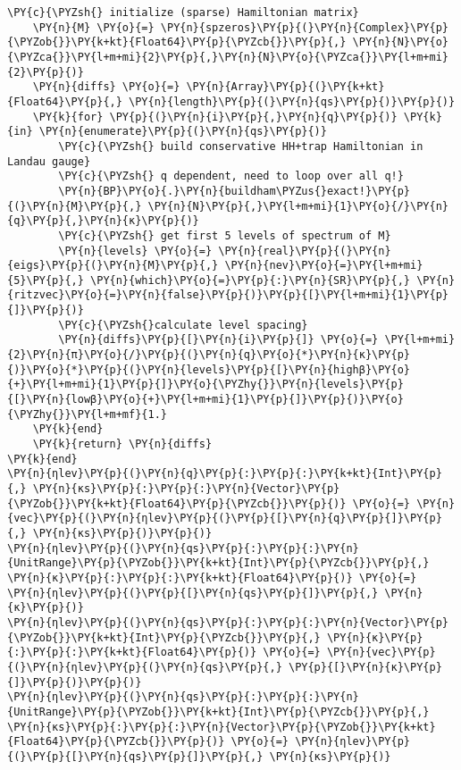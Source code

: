 \begin{Verbatim}[commandchars=\\\{\}]
    \PY{c}{\PYZsh{} initialize (sparse) Hamiltonian matrix}
    \PY{n}{M} \PY{o}{=} \PY{n}{spzeros}\PY{p}{(}\PY{n}{Complex}\PY{p}{\PYZob{}}\PY{k+kt}{Float64}\PY{p}{\PYZcb{}}\PY{p}{,} \PY{n}{N}\PY{o}{\PYZca{}}\PY{l+m+mi}{2}\PY{p}{,}\PY{n}{N}\PY{o}{\PYZca{}}\PY{l+m+mi}{2}\PY{p}{)}
    \PY{n}{diffs} \PY{o}{=} \PY{n}{Array}\PY{p}{(}\PY{k+kt}{Float64}\PY{p}{,} \PY{n}{length}\PY{p}{(}\PY{n}{qs}\PY{p}{)}\PY{p}{)}
    \PY{k}{for} \PY{p}{(}\PY{n}{i}\PY{p}{,}\PY{n}{q}\PY{p}{)} \PY{k}{in} \PY{n}{enumerate}\PY{p}{(}\PY{n}{qs}\PY{p}{)}
        \PY{c}{\PYZsh{} build conservative HH+trap Hamiltonian in Landau gauge}
        \PY{c}{\PYZsh{} q dependent, need to loop over all q!}
        \PY{n}{BP}\PY{o}{.}\PY{n}{buildham\PYZus{}exact!}\PY{p}{(}\PY{n}{M}\PY{p}{,} \PY{n}{N}\PY{p}{,}\PY{l+m+mi}{1}\PY{o}{/}\PY{n}{q}\PY{p}{,}\PY{n}{κ}\PY{p}{)}
        \PY{c}{\PYZsh{} get first 5 levels of spectrum of M}
        \PY{n}{levels} \PY{o}{=} \PY{n}{real}\PY{p}{(}\PY{n}{eigs}\PY{p}{(}\PY{n}{M}\PY{p}{,} \PY{n}{nev}\PY{o}{=}\PY{l+m+mi}{5}\PY{p}{,} \PY{n}{which}\PY{o}{=}\PY{p}{:}\PY{n}{SR}\PY{p}{,} \PY{n}{ritzvec}\PY{o}{=}\PY{n}{false}\PY{p}{)}\PY{p}{[}\PY{l+m+mi}{1}\PY{p}{]}\PY{p}{)}
        \PY{c}{\PYZsh{}calculate level spacing}
        \PY{n}{diffs}\PY{p}{[}\PY{n}{i}\PY{p}{]} \PY{o}{=} \PY{l+m+mi}{2}\PY{n}{π}\PY{o}{/}\PY{p}{(}\PY{n}{q}\PY{o}{*}\PY{n}{κ}\PY{p}{)}\PY{o}{*}\PY{p}{(}\PY{n}{levels}\PY{p}{[}\PY{n}{highβ}\PY{o}{+}\PY{l+m+mi}{1}\PY{p}{]}\PY{o}{\PYZhy{}}\PY{n}{levels}\PY{p}{[}\PY{n}{lowβ}\PY{o}{+}\PY{l+m+mi}{1}\PY{p}{]}\PY{p}{)}\PY{o}{\PYZhy{}}\PY{l+m+mf}{1.}
    \PY{k}{end}
    \PY{k}{return} \PY{n}{diffs}
\PY{k}{end}
\PY{n}{ηlev}\PY{p}{(}\PY{n}{q}\PY{p}{:}\PY{p}{:}\PY{k+kt}{Int}\PY{p}{,} \PY{n}{κs}\PY{p}{:}\PY{p}{:}\PY{n}{Vector}\PY{p}{\PYZob{}}\PY{k+kt}{Float64}\PY{p}{\PYZcb{}}\PY{p}{)} \PY{o}{=} \PY{n}{vec}\PY{p}{(}\PY{n}{ηlev}\PY{p}{(}\PY{p}{[}\PY{n}{q}\PY{p}{]}\PY{p}{,} \PY{n}{κs}\PY{p}{)}\PY{p}{)}
\PY{n}{ηlev}\PY{p}{(}\PY{n}{qs}\PY{p}{:}\PY{p}{:}\PY{n}{UnitRange}\PY{p}{\PYZob{}}\PY{k+kt}{Int}\PY{p}{\PYZcb{}}\PY{p}{,} \PY{n}{κ}\PY{p}{:}\PY{p}{:}\PY{k+kt}{Float64}\PY{p}{)} \PY{o}{=} \PY{n}{ηlev}\PY{p}{(}\PY{p}{[}\PY{n}{qs}\PY{p}{]}\PY{p}{,} \PY{n}{κ}\PY{p}{)}
\PY{n}{ηlev}\PY{p}{(}\PY{n}{qs}\PY{p}{:}\PY{p}{:}\PY{n}{Vector}\PY{p}{\PYZob{}}\PY{k+kt}{Int}\PY{p}{\PYZcb{}}\PY{p}{,} \PY{n}{κ}\PY{p}{:}\PY{p}{:}\PY{k+kt}{Float64}\PY{p}{)} \PY{o}{=} \PY{n}{vec}\PY{p}{(}\PY{n}{ηlev}\PY{p}{(}\PY{n}{qs}\PY{p}{,} \PY{p}{[}\PY{n}{κ}\PY{p}{]}\PY{p}{)}\PY{p}{)}
\PY{n}{ηlev}\PY{p}{(}\PY{n}{qs}\PY{p}{:}\PY{p}{:}\PY{n}{UnitRange}\PY{p}{\PYZob{}}\PY{k+kt}{Int}\PY{p}{\PYZcb{}}\PY{p}{,} \PY{n}{κs}\PY{p}{:}\PY{p}{:}\PY{n}{Vector}\PY{p}{\PYZob{}}\PY{k+kt}{Float64}\PY{p}{\PYZcb{}}\PY{p}{)} \PY{o}{=} \PY{n}{ηlev}\PY{p}{(}\PY{p}{[}\PY{n}{qs}\PY{p}{]}\PY{p}{,} \PY{n}{κs}\PY{p}{)}

\end{Verbatim}
